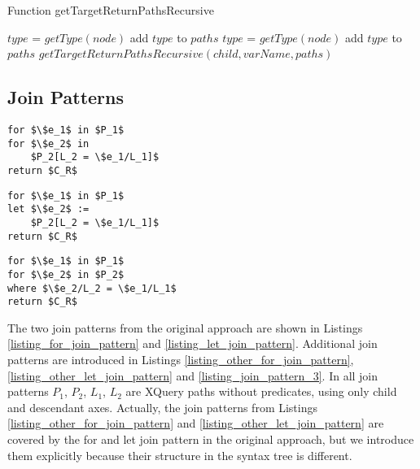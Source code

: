 \begin{algorithm}
\caption{Function getTargetReturnPathsRecursive}
\label{ALG_function_get_target_return_paths_recursive}
\begin{algorithmic}[1]

	\STATE $type$ = $getType(node)$
		\STATE add $type$ to $paths$
	\ENDIF
{}
		\STATE $type$ = $getType(node)$
			\STATE add $type$ to $paths$
		\ENDIF
	\ENDIF
\ENDIF
{}
	\STATE $getTargetReturnPathsRecursive(child, varName, paths)$
\ENDFOR
\end{algorithmic}
\end{algorithm}

\subsection{Join Patterns}

\begin{lstlisting}[mathescape, float, caption=Other form of the for join pattern., frame=single, label=listing_other_for_join_pattern]
for $\$e_1$ in $P_1$
for $\$e_2$ in
    $P_2[L_2 = \$e_1/L_1]$
return $C_R$
\end{lstlisting}

\begin{lstlisting}[mathescape, float, caption=Other form of the let join pattern., frame=single, label=listing_other_let_join_pattern]
for $\$e_1$ in $P_1$
let $\$e_2$ :=
    $P_2[L_2 = \$e_1/L_1]$
return $C_R$
\end{lstlisting}

\begin{lstlisting}[mathescape, float, caption=Join pattern 3., frame=single, label=listing_join_pattern_3]
for $\$e_1$ in $P_1$
for $\$e_2$ in $P_2$
where $\$e_2/L_2 = \$e_1/L_1$
return $C_R$
\end{lstlisting}

The two join patterns from the original approach are shown in Listings \ref{listing_for_join_pattern} and \ref{listing_let_join_pattern}. Additional join patterns are introduced in Listings \ref{listing_other_for_join_pattern}, \ref{listing_other_let_join_pattern} and \ref{listing_join_pattern_3}. In all join patterns $P_1$, $P_2$, $L_1$, $L_2$ are XQuery paths without predicates, using only child and descendant axes. Actually, the join patterns from Listings \ref{listing_other_for_join_pattern} and \ref{listing_other_let_join_pattern} are covered by the for and let join pattern in the original approach, but we introduce them explicitly because their structure in the syntax tree is different.


